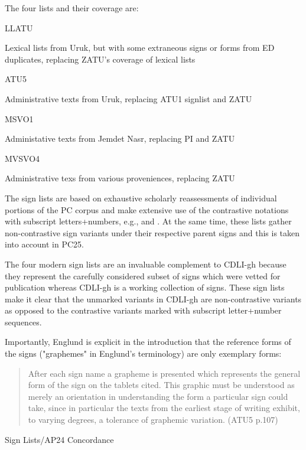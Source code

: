 \par The four lists and their coverage are:

\Hdl\Hdt{}LLATU

{}Lexical lists from Uruk, but with some extraneous signs or
	forms from ED duplicates, replacing ZATU's coverage of lexical
	lists

\Hdt{}ATU5

{}Administrative texts from Uruk, replacing ATU1 signlist and ZATU

\Hdt{}MSVO1

{}Administative texts from Jemdet Nasr, replacing PI and ZATU

\Hdt{}MVSVO4

{}Administrative texs from various proveniences, replacing ZATU

\Henddl

\par The sign lists are based on exhaustive scholarly
      reassessments of individual portions of the PC corpus and make
      extensive use of the contrastive notations with subscript
      letters+numbers, e.g.,  and
      .  At the same time, these lists
      gather non-contrastive sign variants under their respective
      parent signs and this is taken into account in PC25.


\par The four modern sign lists are an invaluable complement to
      CDLI-gh because they represent the carefully considered subset
      of signs which were vetted for publication whereas CDLI-gh is a
      working collection of signs.  These sign lists make it clear
      that the unmarked variants in CDLI-gh are non-contrastive
      variants as opposed to the contrastive variants marked with
      subscript letter+number sequences.


\par Importantly, Englund is explicit in the introduction that the
      reference forms of the signs ("graphemes" in Englund's
      terminology) are only exemplary forms:

\begin{quote}After each sign name a grapheme is presented which
      represents the general form of the sign on the tablets
      cited. This graphic must be understood as merely an orientation
      in understanding the form a particular sign could take, since in
      particular the texts from the earliest stage of writing exhibit,
      to varying degrees, a tolerance of graphemic variation.  (ATU5
      p.107)
\end{quote}
\Hhhh{}Sign Lists/AP24 Concordance


